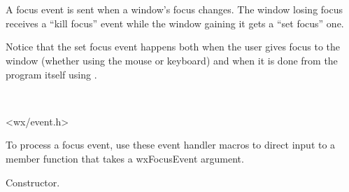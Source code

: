 \section{}\label{wxfocusevent}

A focus event is sent when a window's focus changes. The window losing focus
receives a ``kill focus'' event while the window gaining it gets a ``set
focus'' one.

Notice that the set focus event happens both when the user gives focus to the
window (whether using the mouse or keyboard) and when it is done from the
program itself using .


\\


<wx/event.h>


To process a focus event, use these event handler macros to direct input to a member
function that takes a wxFocusEvent argument.

\twocolwidtha{7cm}
\begin{twocollist}\itemsep=0pt
\end{twocollist}%






Constructor.

